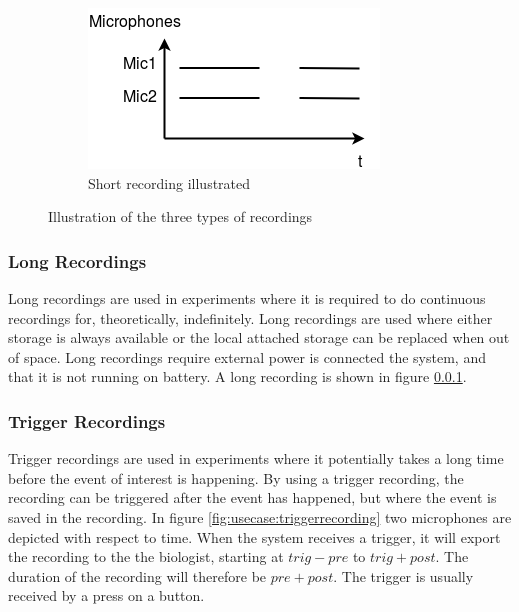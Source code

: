 \begin{figure}[H]
    \begin{subfigure}[b]{0.3\textwidth}
        \includegraphics[width=\textwidth]{figures/recording_short.png}
        \caption{Short recording illustrated}
        \label{fig:usecase:shortrecording}
    \end{subfigure}
    \caption{Illustration of the three types of recordings}\label{fig:usecase:recordingtypes}
\end{figure}
\subsubsection{Long Recordings}\label{sec:usecase:longrecording}
Long recordings are used in experiments where it is required to do continuous recordings for, theoretically, indefinitely. Long recordings are used where either storage is always available or the local attached storage can be replaced when out of space. Long recordings  require external power is connected the system, and that it is not running on battery. A long recording is shown in figure \ref{sec:usecase:longrecording}.

\subsubsection{Trigger Recordings}\label{sec:usecase:triggerrecording}
Trigger recordings are used in experiments where it potentially takes a long time before the event of interest is happening. By using a trigger recording, the recording can be triggered after the event has happened, but where the event is saved in the recording. In figure \ref{fig:usecase:triggerrecording} two microphones are depicted with respect to time. When the system receives a trigger, it will export the recording to the the biologist, starting at $trig-pre$ to $trig+post$. The duration of the recording will therefore be $pre+post$. The trigger is usually received by a press on a button.

